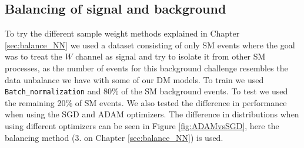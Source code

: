 \documentclass[12pt, a4paper]{book}
\begin{document}
\subsection{Balancing of signal and background}\label{sec:NN_balance_rst}
To try the different sample weight methods explained in Chapter \ref{sec:balance_NN} we used a dataset consisting of only SM events where the goal was to treat the $W$ channel as signal and try to isolate it from other SM processes, as the number of events for this background challenge resembles the data unbalance we have with some of our DM models. 
To train we used \verb|Batch_normalization| and 80\% of the SM background events. 
To test we used the remaining 20\% of SM events. We also tested the difference in performance when using the SGD and ADAM optimizers. The difference in distributions when using different optimizers can be seen in Figure \ref{fig:ADAMvsSGD}, here the balancing method (3. on Chapter \ref{sec:balance_NN}) is used.
\graphicspath{{../../Plots/NeuralNetwork/W/}} 
\end{document}
